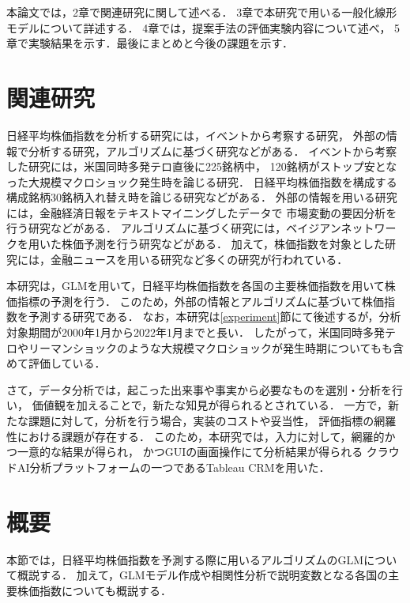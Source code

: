 \documentclass[submit,techrep,noauthor]{ipsj}
\begin{document}
本論文では，2章で関連研究に関して述べる．
3章で本研究で用いる一般化線形モデルについて詳述する．
4章では，提案手法の評価実験内容について述べ，
5章で実験結果を示す．最後にまとめと今後の課題を示す．

\section{関連研究}
日経平均株価指数を分析する研究には，イベントから考察する研究，
外部の情報で分析する研究，アルゴリズムに基づく研究などがある．
%
イベントから考察した研究には，米国同時多発テロ直後に225銘柄中，
120銘柄がストップ安となった大規模マクロショック発生時を論じる研究\cite{gendaifinance01}．
日経平均株価指数を構成する構成銘柄30銘柄入れ替え時を論じる研究\cite{gendaifinance02}などがある．
%
外部の情報を用いる研究には，金融経済日報をテキストマイニングしたデータで
市場変動の要因分析を行う研究\cite{financialmarkets01}\cite{financialmarkets02}などがある．
%
アルゴリズムに基づく研究には，ベイジアンネットワークを用いた株価予測を行う研究\cite{weko79192}などがある．
%
加えて，株価指数を対象とした研究には，金融ニュースを用いる研究\cite{financialnewsarticles}など多くの研究が行われている．

本研究は，GLMを用いて，日経平均株価指数を各国の主要株価指数を用いて株価指標の予測を行う．
このため，外部の情報とアルゴリズムに基づいて株価指数を予測する研究である．
%
なお，本研究は\ref{experiment}節にて後述するが，分析対象期間が2000年1月から2022年1月までと長い．
したがって，米国同時多発テロやリーマンショックのような大規模マクロショックが発生時期についてもも含めて評価している．

さて，データ分析では，起こった出来事や事実から必要なものを選別・分析を行い，
価値観を加えることで，新たな知見が得られるとされている\cite{nttdata}．
一方で，新たな課題に対して，分析を行う場合，実装のコストや妥当性，
評価指標の網羅性における課題が存在する．
%
このため，本研究では，入力に対して，網羅的かつ一意的な結果が得られ，
かつGUIの画面操作にて分析結果が得られる
クラウドAI分析プラットフォームの一つであるTableau CRMを用いた．

\newpage
\section{概要}
\vspace{-2mm}
本節では，日経平均株価指数を予測する際に用いるアルゴリズムのGLMについて概説する．
加えて，GLMモデル作成や相関性分析で説明変数となる各国の主要株価指数についても概説する．

\vspace{-2mm}
\end{document}
